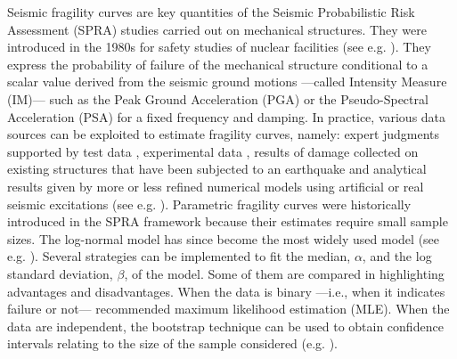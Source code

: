 Seismic fragility curves are key quantities of the Seismic Probabilistic Risk Assessment (SPRA) studies carried out on mechanical structures. They were introduced in the 1980s for safety studies of nuclear facilities (see e.g.
\cite{kennedy_probabilistic_1980,kennedy_seismic_1984,park_survey_1998,kennedy_risk_1999,cornell_hazard_2004}).
They express the probability of failure of the mechanical structure conditional to a scalar value derived from the seismic ground motions ---called Intensity Measure (IM)--- such as the Peak Ground Acceleration (PGA) or the Pseudo-Spectral Acceleration (PSA) for a fixed frequency and damping. In practice, various data sources can be exploited to estimate fragility curves, namely: expert judgments supported by test data \citep{kennedy_probabilistic_1980,kennedy_seismic_1984,park_survey_1998,zentner_fragility_2017}, experimental data \citep{park_survey_1998,gardoni_probabilistic_2002,choe_closed-form_2007}, results of damage collected on existing structures that have been subjected to an earthquake \citep{shinozuka_statistical_2000,lallemant_statistical_2015,straub_improved_2008}  and analytical results given by more or less refined numerical models using artificial or real seismic excitations (see e.g. \cite{zentner_numerical_2010,wang_influence_2020,mandal_seismic_2016,wang_seismic_2018,wang_bayesian_2018,zhao_seismic_2020}). Parametric fragility curves were historically introduced in the SPRA framework because their estimates require small sample sizes. The log-normal model has since become the most widely used model (see e.g. \cite{shinozuka_statistical_2000,lallemant_statistical_2015,straub_improved_2008,zentner_numerical_2010,wang_influence_2020,mandal_seismic_2016,wang_bayesian_2018,wang_seismic_2018,zhao_seismic_2020,ellingwood_earthquake_2001,kim_development_2004,mai_seismic_2017,trevlopoulos_parametric_2019,katayama_bayesian-estimation-based_2021}).
Several strategies can be implemented to fit the median, $\alpha$, and the log standard deviation, $\beta$, of the model. Some of them are compared in \cite{lallemant_statistical_2015} highlighting advantages and disadvantages.
When the data is binary ---i.e., when it indicates failure or not--- \citet{lallemant_statistical_2015} recommended maximum likelihood estimation (MLE). When the data are independent, the bootstrap technique can be used to obtain confidence intervals relating to the size of the sample considered (e.g. \cite{shinozuka_statistical_2000,zentner_numerical_2010,wang_influence_2020}). 

